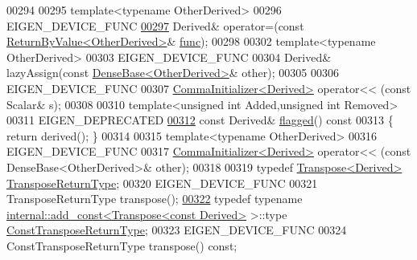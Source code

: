\begin{DoxyCode}
00294 
00295     \textcolor{keyword}{template}<\textcolor{keyword}{typename} OtherDerived>
00296     EIGEN\_DEVICE\_FUNC
\hyperlink{group___core___module_a17870bf03c6c431415882b214c244d0a}{00297}     Derived& operator=(\textcolor{keyword}{const} \hyperlink{group___core___module_class_eigen_1_1_return_by_value}{ReturnByValue<OtherDerived>}& 
      \hyperlink{structfunc}{func});
00298 
00302     \textcolor{keyword}{template}<\textcolor{keyword}{typename} OtherDerived>
00303     EIGEN\_DEVICE\_FUNC
00304     Derived& lazyAssign(\textcolor{keyword}{const} \hyperlink{group___core___module_class_eigen_1_1_dense_base}{DenseBase<OtherDerived>}& other);
00305 
00306     EIGEN\_DEVICE\_FUNC
00307     \hyperlink{group___core___module_struct_eigen_1_1_comma_initializer}{CommaInitializer<Derived>} operator<< (\textcolor{keyword}{const} Scalar& s);
00308 
00310     \textcolor{keyword}{template}<\textcolor{keywordtype}{unsigned} \textcolor{keywordtype}{int} Added,\textcolor{keywordtype}{unsigned} \textcolor{keywordtype}{int} Removed>
00311     EIGEN\_DEPRECATED
\hyperlink{group___core___module_a9b3f75f76ae40439be870258e80c7346}{00312}     \textcolor{keyword}{const} Derived& \hyperlink{group___core___module_a9b3f75f76ae40439be870258e80c7346}{flagged}()\textcolor{keyword}{ const}
00313 \textcolor{keyword}{    }\{ \textcolor{keywordflow}{return} derived(); \}
00314 
00315     \textcolor{keyword}{template}<\textcolor{keyword}{typename} OtherDerived>
00316     EIGEN\_DEVICE\_FUNC
00317     \hyperlink{group___core___module_struct_eigen_1_1_comma_initializer}{CommaInitializer<Derived>} operator<< (const DenseBase<OtherDerived>& other);
00318 
00319     \textcolor{keyword}{typedef} \hyperlink{group___core___module_class_eigen_1_1_transpose}{Transpose<Derived>} \hyperlink{group___core___module_class_eigen_1_1_transpose}{TransposeReturnType};
00320     EIGEN\_DEVICE\_FUNC
00321     TransposeReturnType transpose();
\hyperlink{group___core___module_af60fcba2704ae771c148de156cf2c96b}{00322}     \textcolor{keyword}{typedef} \textcolor{keyword}{typename} \hyperlink{struct_eigen_1_1internal_1_1add__const}{internal::add\_const<Transpose<const Derived>}
       >::type \hyperlink{group___core___module_class_eigen_1_1_transpose}{ConstTransposeReturnType};
00323     EIGEN\_DEVICE\_FUNC
00324     ConstTransposeReturnType transpose() \textcolor{keyword}{const};

\end{DoxyCode}
